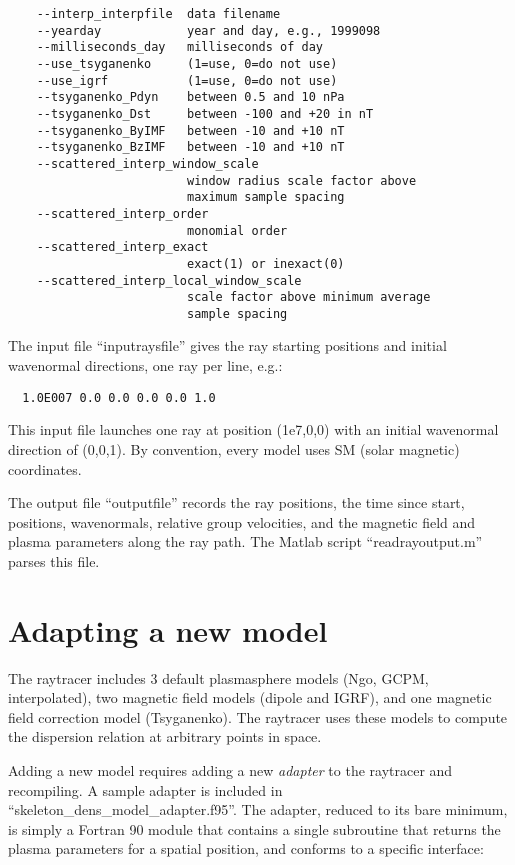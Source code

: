 \documentclass[10pt]{article}
\begin{document}
\begin{verbatim}
    --interp_interpfile  data filename
    --yearday            year and day, e.g., 1999098
    --milliseconds_day   milliseconds of day
    --use_tsyganenko     (1=use, 0=do not use)
    --use_igrf           (1=use, 0=do not use)
    --tsyganenko_Pdyn    between 0.5 and 10 nPa
    --tsyganenko_Dst     between -100 and +20 in nT
    --tsyganenko_ByIMF   between -10 and +10 nT
    --tsyganenko_BzIMF   between -10 and +10 nT
    --scattered_interp_window_scale
                         window radius scale factor above
                         maximum sample spacing
    --scattered_interp_order
                         monomial order
    --scattered_interp_exact
                         exact(1) or inexact(0)
    --scattered_interp_local_window_scale
                         scale factor above minimum average
                         sample spacing
\end{verbatim}

The input file ``inputraysfile'' gives the ray starting positions and
initial wavenormal directions, one ray per line, e.g.:
\begin{verbatim}
  1.0E007 0.0 0.0 0.0 0.0 1.0
\end{verbatim}
This input file launches one ray at position (1e7,0,0) with an initial
wavenormal direction of (0,0,1).  By convention, every model uses SM
(solar magnetic) coordinates.

The output file ``outputfile'' records the ray positions, the time
since start, positions, wavenormals, relative group velocities, and
the magnetic field and plasma parameters along the ray path.  The
Matlab script ``readrayoutput.m'' parses this file.

\section{Adapting a new model}
The raytracer includes 3 default plasmasphere models (Ngo, GCPM,
interpolated), two magnetic field models (dipole and IGRF), and one
magnetic field correction model (Tsyganenko).  The raytracer uses
these models to compute the dispersion relation at arbitrary points in
space.

Adding a new model requires adding a new {\em adapter} to the
raytracer and recompiling.  A sample adapter is included in
``skeleton\_dens\_model\_adapter.f95''.  The adapter, reduced to its
bare minimum, is simply a Fortran 90 module that contains a single
subroutine that returns the plasma parameters for a spatial position,
and conforms to a specific interface:
\end{document}

